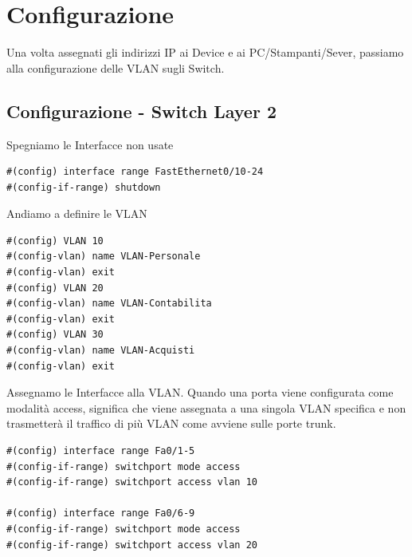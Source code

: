 \documentclass[12pt]{article}
\begin{document}
    \newpage
   
    \section{Configurazione}
    Una volta assegnati gli indirizzi IP ai Device e ai PC/Stampanti/Sever, passiamo alla configurazione delle VLAN sugli Switch.
    
    \subsection{Configurazione - Switch Layer 2}
        \begin{center}
            Spegniamo le Interfacce non usate
            \begin{tcolorbox}[title=SwitchPianoT, colframe=gray!50!gray, colback=white!50!white]
                \begin{lstlisting}
#(config) interface range FastEthernet0/10-24
#(config-if-range) shutdown
                \end{lstlisting}
            \end{tcolorbox}
            Andiamo a definire le VLAN
            \begin{tcolorbox}[title=SwitchPianoT, colframe=gray!50!gray, colback=white!50!white]
                \begin{lstlisting}
#(config) VLAN 10
#(config-vlan) name VLAN-Personale
#(config-vlan) exit
#(config) VLAN 20
#(config-vlan) name VLAN-Contabilita
#(config-vlan) exit
#(config) VLAN 30
#(config-vlan) name VLAN-Acquisti
#(config-vlan) exit
                \end{lstlisting}
            \end{tcolorbox}
            Assegnamo le Interfacce alla VLAN. Quando una porta viene configurata come modalità access, significa che viene assegnata a una singola VLAN specifica e non trasmetterà il traffico di più VLAN come avviene sulle porte trunk.
            \begin{tcolorbox}[title=SwitchPianoT, colframe=gray!50!gray, colback=white!50!white]
                \begin{lstlisting}
#(config) interface range Fa0/1-5
#(config-if-range) switchport mode access
#(config-if-range) switchport access vlan 10

#(config) interface range Fa0/6-9
#(config-if-range) switchport mode access
#(config-if-range) switchport access vlan 20
                \end{lstlisting} 
            \end{tcolorbox}


\end{center}
\end{document}
